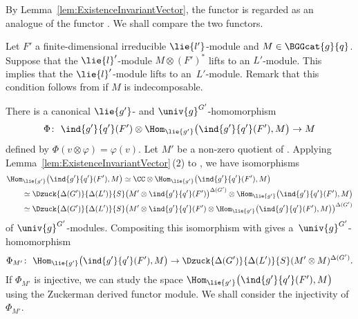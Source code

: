 By Lemma~\ref{lem:ExistenceInvariantVector}, the functor  is regarded as an analogue of the functor .
We shall compare the two functors.

Let $F'$ a finite-dimensional irreducible $\lie{l'}$-module and $M \in \BGGcat{g}{q}$.
Suppose that the $\lie{l}'$-module $M \otimes (F')^*$ lifts to an $L'$-module.
This implies that the $\lie{l}'$-module  lifts to an~\mbox{$L'$-module}.
Remark that this condition follows from  if $M$ is indecomposable.

There is a canonical $\lie{g'}$- and $\univ{g}^{G'}$-homomorphism
\begin{align*}
\Phi \colon\ \ind{g'}{q'}(F') \otimes \Hom_{\lie{g'}}\bigl(\ind{g'}{q'}(F'), M\bigr)
\rightarrow M
\end{align*}
defined by $\Phi(v \otimes \varphi) = \varphi(v)$.
Let $M'$ be a non-zero quotient of .
Applying Lem\-ma~\ref{lem:ExistenceInvariantVector}\,(2) to , we have isomorphisms
\begin{align}
	&\Hom_{\lie{g'}}\bigl(\ind{g'}{q'}(F'), M\bigr) \simeq \CC\otimes \Hom_{\lie{g'}}\bigl(\ind{g'}{q'}(F'), M\bigr) \nonumber \\
	&\qquad{}\simeq \Dzuck{\Delta(G')}{\Delta(L')}{S}\bigl(M'\otimes \ind{g'}{q'}(F')\bigr)^{\Delta(G')}\otimes \Hom_{\lie{g'}}\bigl(\ind{g'}{q'}(F'), M\bigr) \nonumber \\
	&\qquad{}\simeq \Dzuck{\Delta(G')}{\Delta(L')}{S}\bigl(M'\otimes \ind{g'}{q'}(F') \otimes \Hom_{\lie{g'}}\bigl(\ind{g'}{q'}(F'), M\bigr)\bigr)^{\Delta(G')} \label{eqn:IsomHomZuck}
\end{align}
of $\univ{g}^{G'}$-modules.
Compositing this isomorphism with  gives a~$\univ{g}^{G'}$-homomorphism
\begin{align*}
	\Phi_{M'} \colon\ \Hom_{\lie{g'}}\bigl(\ind{g'}{q'}(F'), M\bigr)\rightarrow \Dzuck{\Delta(G')}{\Delta(L')}{S}(M'\otimes M)^{\Delta(G')}.
\end{align*}
If $\Phi_{M'}$ is injective, we can study the space $\Hom_{\lie{g'}}\bigl(\ind{g'}{q'}(F'), M\bigr)$ using the Zuckerman derived functor module.
We shall consider the injectivity of $\Phi_{M'}$.

